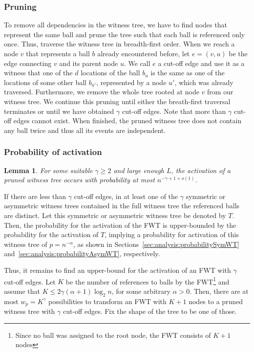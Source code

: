 \documentclass[a4paper,12pt]{article}
\newtheorem{lemma}{Lemma}
\begin{document}
\subsubsection{Pruning}
\label{sec:analysis:pruningFullWT}
To remove all dependencies in the witness tree, we have to find nodes that represent the same ball and prune the tree such that each ball is referenced only once. Thus, traverse the witness tree in breadth-first order. When we reach a node $v$ that represents a ball $b$ already encountered before, let $e = (v,u)$ be the edge connecting $v$ and its parent node $u$. We call $e$ a cut-off edge and use it as a witness that one of the $d$ locations of the ball $b_u$ is the same as one of the locations of some other ball $b_{u'}$, represented by a node $u'$, which was already traversed. Furthermore, we remove the whole tree rooted at node $v$ from our witness tree. We continue this pruning until either the breath-first traversal terminates or until we have obtained $\gamma$ cut-off edges. Note that more than $\gamma$ cut-off edges cannot exist. When finished, the pruned witness tree does not contain any ball twice and thus all its events are independent. 

\subsubsection{Probability of activation}
\label{sec:analysis:probabilityFullWT}
\begin{lemma}\label{lemma:fwt:activation}
For some suitable $\gamma \geq 2$ and large enough $L$, the activation of a pruned witness tree occurs with probability at most $n^{-\gamma +1 +o(1)}$.
\end{lemma}
If there are less than $\gamma$ cut-off edges, in at least one of the $\gamma$ symmetric or asymmetric witness trees contained in the full witness tree the referenced balls are distinct. Let this symmetric or asymmetric witness tree be denoted by $T$. Then, the probability for the activation of the FWT is upper-bounded by the probability for the activation of $T$, implying a probability for activation of this witness tree of $p = n^{- \alpha}$, as shown in Sections~\ref{sec:analysis:probabilitySymWT} and~\ref{sec:analysis:probabilityAsymWT}, respectively.

Thus, it remains to find an upper-bound for the activation of an FWT with $\gamma$ cut-off edges. Let $K$ be the number of references to balls by the FWT\footnote{Since no ball was assigned to the root node, the FWT consists of $K+1$ nodes} and assume that $K  \leq 2 \gamma\left(\alpha+1\right) \log_2 n$, for some arbitrary $\alpha > 0$. Then, there are at most $w_p=K^\gamma$ possibilities to transform an FWT with $K+1$ nodes to a pruned witness tree with $\gamma$ cut-off edges. Fix the shape of the tree to be one of those. 
\end{document}
